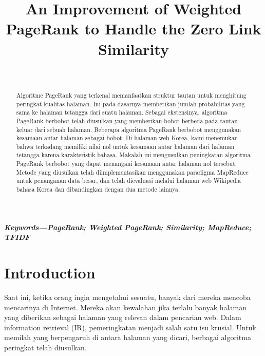 \documentclass[conference]{IEEEtran}
\title{\textbf{An Improvement of Weighted PageRank to Handle the Zero Link Similarity}}
\author{\IEEEauthorblockN{Putri Ade Damaiyanti}\\
\IEEEauthorblockA{Fakultas Teknologi Informasi\\
Institut Teknologi Batam\\
Batam, Kepulauan Riau, Indonesia\\
2022028@student.iteba.ac.id}}
\begin{document}
\maketitle

\begin{abstract}
    Algoritme PageRank yang terkenal memanfaatkan struktur tautan untuk menghitung peringkat kualitas halaman. Ini pada dasarnya memberikan jumlah probabilitas yang sama ke halaman tetangga dari suatu halaman. Sebagai ekstensinya, algoritma PageRank berbobot telah diusulkan yang memberikan bobot berbeda pada tautan keluar dari sebuah halaman. Beberapa algoritma PageRank berbobot menggunakan kesamaan antar halaman sebagai bobot. Di halaman web Korea, kami menemukan bahwa terkadang memiliki nilai nol untuk kesamaan antar halaman dari halaman tetangga karena karakteristik bahasa. Makalah ini mengusulkan peningkatan algoritma PageRank berbobot yang dapat menangani kesamaan antar halaman nol tersebut. Metode yang diusulkan telah diimplementasikan menggunakan paradigma MapReduce untuk penanganan data besar, dan telah dievaluasi melalui halaman web Wikipedia bahasa Korea dan dibandingkan dengan dua metode lainnya.

\end{abstract}\hspace{10pt}

\textbf{\textit{Keywords---PageRank; Weighted PageRank; Similarity; MapReduce; TFIDF}}
\section{Introduction}
Saat ini, ketika orang ingin mengetahui sesuatu, banyak dari mereka mencoba mencarinya di Internet. Mereka akan kewalahan jika terlalu banyak halaman yang diberikan sebagai halaman yang relevan dalam pencarian web. Dalam information retrieval (IR), pemeringkatan menjadi salah satu isu krusial. Untuk memilah yang berpengaruh di antara halaman yang dicari, berbagai algoritma peringkat telah diusulkan. \cite{brin1998anatomy,xing2004weighted,qiao2010simrank,page1999pagerank,kumar2013pagerank,duhan2009page,najork2007comparing,kumar2011page,nemirovsky2008weighted,tyagi2012weighted,haveliwala2003topic}
\end{document}
